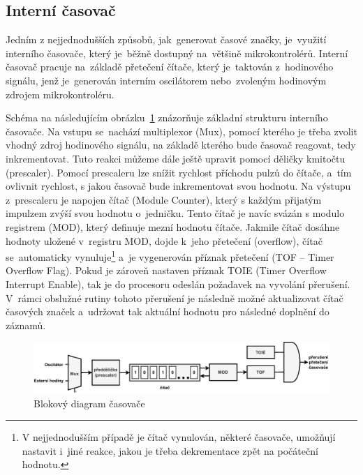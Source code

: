 \subsection{Interní časovač}
Jedním z nejjednodušších způsobů, jak~generovat časové značky, je~využití interního časovače, který je~běžně dostupný na~většině mikrokontrolérů. Interní časovač pracuje na~základě přetečení čítače, který je~taktován z~hodinového signálu, jenž je~generován interním oscilátorem nebo~zvoleným hodinovým zdrojem mikrokontroléru.~\cite{nxp_KL05_Reference_Manual}

Schéma na následujícím obrázku~\ref{fig:timer} znázorňuje základní strukturu interního časovače. Na vstupu se~nachází multiplexor (Mux), pomocí kterého je třeba zvolit vhodný zdroj hodinového signálu, na základě kterého bude časovač reagovat, tedy inkrementovat. Tuto reakci můžeme dále ještě upravit pomocí děličky kmitočtu (prescaler). Pomocí prescaleru lze snížit rychlost příchodu pulzů do čítače, a~tím ovlivnit rychlost, s jakou časovač bude inkrementovat svou hodnotu. Na výstupu z~prescaleru je napojen čítač (Module Counter), který s každým přijatým impulzem zvýší svou hodnotu o~jedničku. Tento čítač je navíc svázán s modulo registrem (MOD), který definuje mezní hodnotu čítače. Jakmile čítač dosáhne hodnoty uložené v~registru MOD, dojde k~jeho přetečení (overflow), čítač se~automaticky vynuluje\footnote{V nejjednodušším případě je čítač vynulován, některé časovače, umožňují nastavit i~jiné reakce, jakou je třeba dekrementace zpět na počáteční hodnotu.} a~je vygenerován příznak přetečení (TOF -- Timer Overflow Flag). Pokud je zároveň nastaven příznak TOIE (Timer Overflow Interrupt Enable), tak je do procesoru odeslán požadavek na vyvolání přerušení. V~rámci obslužné rutiny tohoto přerušení je následně možné aktualizovat čítač časových značek a~udržovat tak aktuální hodnotu pro následné doplnění do záznamů.~\cite{nxp_KL05_Reference_Manual}

\newpage

\begin{figure}[h]
    \centering
    \includegraphics[width=1.00\textwidth]{obrazky-figures/timer-cz.pdf}
    
    \caption{Blokový diagram časovače~\cite{nxp_KL05_Reference_Manual}}
    \label{fig:timer}
\end{figure}

